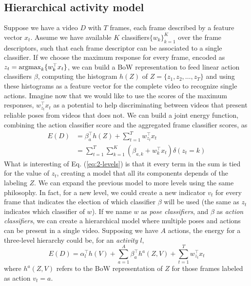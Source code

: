\subsection{Hierarchical activity model}

Suppose we have a video $D$ with $T$ frames, each frame described by a feature vector $x_t$. Assume we have available $K$ classifiers$\{w_k\}_{k=1}^K$ over the frame descriptors, such that each frame descriptor can be associated to a single classifier. If we choose the maximum response for every frame, encoded as $z_t = \operatorname*{argmax}_k\{w_k^\top x_t\}$,  we can build a BoW representation to feed linear action classifiers $\beta$, computing the histogram $h(Z)$ of $Z = \{z_1,z_2,\dots,z_T\}$ and using these histograms as a feature vector for the complete video to recognize single actions. Imagine now that we would like to use the scores of the maximum responses, $w_{z_t}^\top x_t$ as a potential to help discriminating between videos that present reliable poses from videos that does not. We can build a joint energy function, combining the action classifier score and the aggregated frame classifier scores, as
\begin{equation}
\label{eq:2-levels}
\begin{split}
E(D) &= \beta_{a}^\top h(Z) + \sum_{t=1}^T w_{z_t}^\top x_t \\ & = \sum_{t=1}^T\sum_{k=1}^K\left(\beta_{a,k} + w_k^\top x_t \right)\delta(z_t=k)
\end{split}
\end{equation}
What is interesting of Eq. (\ref{eq:2-levels}) is that it every term in the sum is tied for the value of $z_t$, creating a model that all its components depends of the labeling $Z$. We can expand the previous model to more levels using the same philosophy. In fact, for a new level, we could create a new indicator $v_t$ for every frame that indicates the election of which classifier $\beta$ will be used (the same as $z_t$ indicates which classifier of $w$). If we name $w$ as \emph{pose classifiers}, and $\beta$ as \emph{action classifiers}, we can create a hierarchical model where multiple poses and actions can be present in a single video. Supposing we have $A$ actions, the energy for a three-level hierarchy could be, for an \emph{activity} $l$,
\begin{equation}
E(D) =\alpha_l^\top h(V) + \sum_{a=1}^A \beta_{a}^\top h^a(Z,V) + \sum_{t=1}^T w_{z_t}^\top x_t 
\end{equation}
where $h^a(Z,V)$ refers to the BoW representation of $Z$ for those frames labeled as action $v_t = a$.

